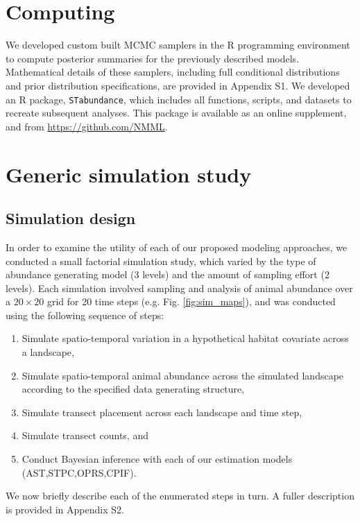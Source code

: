 \documentclass[times,mee,doublespace,]{besauth2}
\begin{document}
\section{Computing}

We developed custom built MCMC samplers in the R programming environment \citep{RTeam2012} to compute posterior summaries for the previously described models.  Mathematical details of these samplers, including full conditional distributions and prior distribution specifications, are provided in Appendix S1.  We developed an R package, \texttt{STabundance}, which includes all functions, scripts, and datasets to recreate subsequent analyses.  This package is available as an online supplement, and from \url{https://github.com/NMML}.

\section{Generic simulation study}

\subsection{Simulation design}

In order to examine the utility of each of our proposed modeling approaches, we conducted a small factorial simulation study, which varied by the type of abundance generating model (3 levels) and the amount of sampling effort (2 levels).  Each simulation involved sampling and analysis of animal abundance over a $20 \times 20$ grid for 20 time steps (e.g. Fig. \ref{fig:sim_maps}), and was conducted using the following sequence of steps:
\begin{enumerate}
 \item Simulate spatio-temporal variation in a hypothetical habitat covariate across a landscape,
 \item Simulate spatio-temporal animal abundance across the simulated landscape according to the specified data generating structure,
 \item Simulate transect placement across each landscape and time step,
 \item Simulate transect counts, and
 \item Conduct Bayesian inference with each of our estimation models (AST,STPC,OPRS,CPIF).
\end{enumerate}
We now briefly describe each of the enumerated steps in turn.  A fuller description is provided in Appendix S2.
\end{document}
